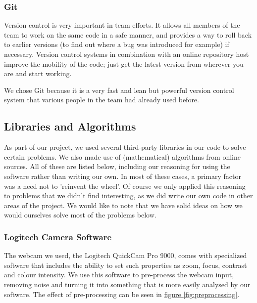 \documentclass[10pt, abstracton, twocolumn]{scrartcl}
\newcommand{\fref}[1]{\hyperref[#1]{figure \vref{#1}}}
\begin{document}
\subsubsection{Git}
Version control is very important in team efforts. It allows all members of the team to work on the same code in a safe manner, and provides a way to roll back to earlier versions (to find out where a bug was introduced for example) if necessary. Version control systems in combination with an online repository host improve the mobility of the code; just get the latest version from wherever you are and start working.

We chose Git because it is a very fast and lean but powerful version control system that various people in the team had already used before.

\subsection{Libraries and Algorithms}
As part of our project, we used several third-party libraries in our code to solve certain problems. We also made use of (mathematical) algorithms from online sources. All of these are listed below, including our reasoning for using the software rather than writing our own. In most of these cases, a primary factor was a need not to 'reinvent the wheel'. Of course we only applied this reasoning to problems that we didn't find interesting, as we did write our own code in other areas of the project. We would like to note that we have solid ideas on how we would ourselves solve most of the problems below.

\subsubsection{Logitech Camera Software}
The webcam we used, the Logitech QuickCam Pro 9000, comes with specialized software that includes the ability to set such properties as zoom, focus, contrast and colour intensity. We use this software to pre-process the webcam input, removing noise and turning it into something that is more easily analysed by our software. The effect of pre-processing can be seen in \fref{fig:preprocessing}.
\end{document}
